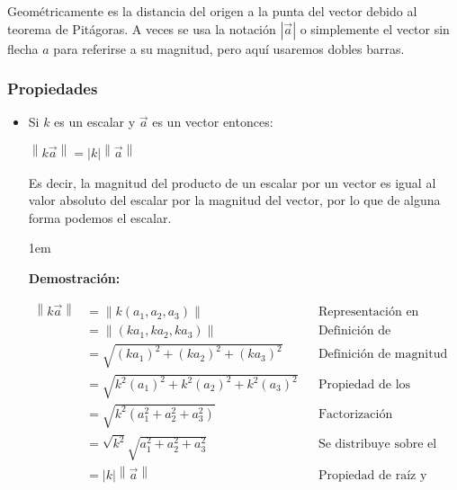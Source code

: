 \documentclass[12pt, fleqn]{report}                             %
\newcommand \Quote {\qq}                                        %
\newenvironment{SmallIndentation}[1][0.75em]                    %
    {\begin{adjustwidth}{#1}{}\begin{footnotesize}}                 %
    {\end{footnotesize}\end{adjustwidth}}                           %
\newcommand{\abs}[1]{\left\lvert #1 \right\lvert}               %
\newcommand{\Abs}[1]{\left\lVert #1 \right\lVert}               %
\begin{document}
            Geométricamente es la distancia del origen a la punta del vector debido al teorema
            de Pitágoras. A veces se usa la notación $\abs{\vec{a}}$ o simplemente el vector
            sin flecha $a$ para referirse a su magnitud, pero aquí usaremos dobles barras.
        

            \vspace{2em}
            \subsubsection{Propiedades}

                \begin{itemize}
                    
                    \item Si $k$ es un escalar y $\vec{a}$ es un vector entonces:
                    
                        $\Abs{k\vec{a}} = \abs{k} \Abs{\vec{a}}$
                        
                        Es decir, la magnitud del producto de un escalar por un vector es
                        igual al valor absoluto del escalar por la magnitud del vector,
                        por lo que de alguna forma podemos \Quote{sacar} el escalar.
                            
                        \begin{SmallIndentation}[1em]
                            \textbf{Demostración:}

                            \begin{align*}
                                \Abs{k\vec{a}}
                                    &= \Abs{k(a_1, a_2, a_3)}                       &&\mbox{Representación en Coordenadas}             \\
                                    &= \Abs{(ka_1, ka_2, ka_3)}                     &&\mbox{Definición de multiplicación por escalar}  \\
                                    &= \sqrt{(ka_1)^2 + (ka_2)^2 + (ka_3)^2}        &&\mbox{Definición de magnitud}                    \\
                                    &= \sqrt{k^2(a_1)^2 + k^2(a_2)^2 + k^2(a_3)^2}  &&\mbox{Propiedad de los exponentes en los reales} \\
                                    &= \sqrt{k^2(a_1^2 + a_2^2 + a_3^2)}            &&\mbox{Factorización}                             \\
                                    &= \sqrt{k^2}\sqrt{a_1^2 + a_2^2 + a_3^2}       &&\mbox{Se distribuye sobre el producto de reales} \\
                                    &= \abs{k} \Abs{\vec{a}}                        &&\mbox{Propiedad de raíz y definición de magnitud}
                            \end{align*}


\end{SmallIndentation}
\end{itemize}
\end{document}
